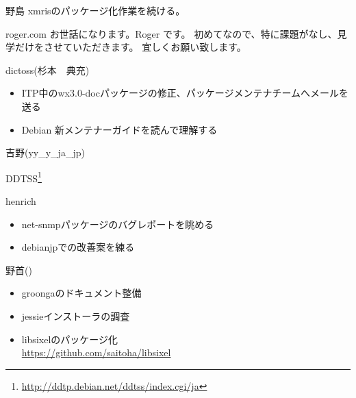 \begin{prework}{ 野島 }
 xmrisのパッケージ化作業を続ける。
\end{prework}

\begin{prework}{ roger\@localet.com }
お世話になります。Roger です。
初めてなので、特に課題がなし、見学だけをさせていただきます。
宜しくお願い致します。
\end{prework}

\begin{prework}{ dictoss(杉本　典充) }

\begin{itemize}
\item ITP中のwx3.0-docパッケージの修正、パッケージメンテナチームへメールを送る
\item Debian 新メンテナーガイドを読んで理解する
\end{itemize}

\end{prework}

\begin{prework}{ 吉野(yy\_{}y\_{}ja\_{}jp) }

DDTSS\footnote{\url{http://ddtp.debian.net/ddtss/index.cgi/ja}}

\end{prework}

\begin{prework}{ henrich }

\begin{itemize}
\item net-snmpパッケージのバグレポートを眺める
\item debianjpでの改善案を練る
\end{itemize}

\end{prework}

\begin{prework}{ 野首(\@knok) }
\begin{itemize}
\item groongaのドキュメント整備
\item jessieインストーラの調査
\item libsixelのパッケージ化 \\
\url{https://github.com/saitoha/libsixel}
\end{itemize}
\end{prework}

